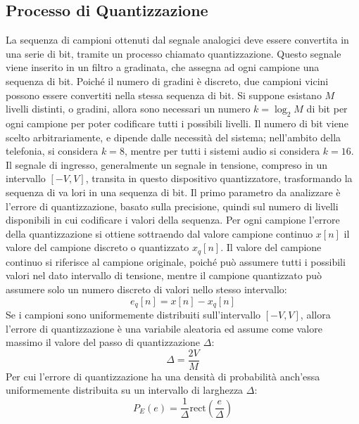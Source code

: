 \documentclass{article}
\newcommand{\rect}{\mathrm{rect}}
\numberwithin{equation}{subsection}
\begin{document}
\subsection{Processo di Quantizzazione}

La sequenza di campioni ottenuti dal segnale analogici deve essere convertita in una serie di bit, tramite un processo chiamato quantizzazione. Questo segnale viene inserito 
in un filtro a gradinata, che assegna ad ogni campione una sequenza di bit. Poiché il numero di gradini è discreto, due campioni vicini possono essere convertiti nella 
stessa sequenza di bit. 
Si suppone esistano $M$ livelli distinti, o gradini, allora sono necessari un numero $k=\log_{2}M$ di bit per ogni campione per poter codificare tutti i possibili livelli. 
Il numero di bit viene scelto arbitrariamente, e dipende dalle necessità del sistema; nell'ambito della telefonia, si considera $k=8$, mentre per tutti i sistemi audio si 
considera $k=16$. 
Il segnale di ingresso, generalmente un segnale in tensione, compreso in un intervallo $[-V,V]$, transita in questo dispositivo quantizzatore, trasformando la sequenza di va
lori in una sequenza di bit. Il primo parametro da analizzare è l'errore di quantizzazione, basato sulla precisione, quindi sul numero di livelli disponibili in cui 
codificare i valori della sequenza. Per ogni campione l'errore della quantizzazione si ottiene sottraendo dal valore campione continuo $x[n]$ il valore del campione discreto o quantizzato $x_q[n]$. Il 
valore del campione continuo si riferisce al campione originale, poiché può assumere tutti i possibili valori nel dato intervallo di tensione, mentre il campione quantizzato 
può assumere solo un numero discreto di valori nello stesso intervallo:
\begin{equation}
    e_q[n]=x[n]-x_q[n]
\end{equation}
Se i campioni sono uniformemente distribuiti sull'intervallo $[-V,V]$, allora l'errore di quantizzazione è una variabile aleatoria ed assume come valore massimo 
il valore del passo di quantizzazione $\Delta$:
\begin{equation}
    \Delta=\displaystyle\frac{2V}{M}
\end{equation}
Per cui l'errore di quantizzazione ha una densità di probabilità anch'essa uniformemente distribuita su un intervallo di larghezza $\Delta$:
\begin{equation}
    {P}_E(e)=\displaystyle\frac{1}{\Delta}\rect\left(\frac{e}{\Delta}\right)
\end{equation}
\end{document}
